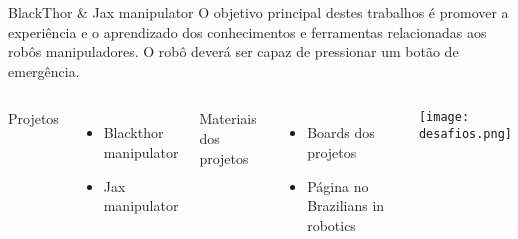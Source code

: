 \begin{frame}[c]{} 
   
    \begin{center}
    \end{center}
       
\end{frame}
%
\begin{frame}[t]{BlackThor \& Jax manipulator} 
   O objetivo principal destes trabalhos é promover a experiência e o aprendizado dos conhecimentos e ferramentas relacionadas aos robôs manipuladores. O robô deverá ser capaz de pressionar um botão de emergência.
   \vspace*{0.3cm}

    \begin{columns}[c]
         Projetos
         \begin{itemize}
          \item Blackthor manipulator
          \item Jax manipulator
         \end{itemize}
         \vspace*{0.3cm}
         Materiais dos projetos
            \begin{itemize}
                \item Boards dos projetos
                \item Página no Brazilians in robotics
            \end{itemize}
            \texttt{[image: desafios.png]}
    \end{columns}

\end{frame}
